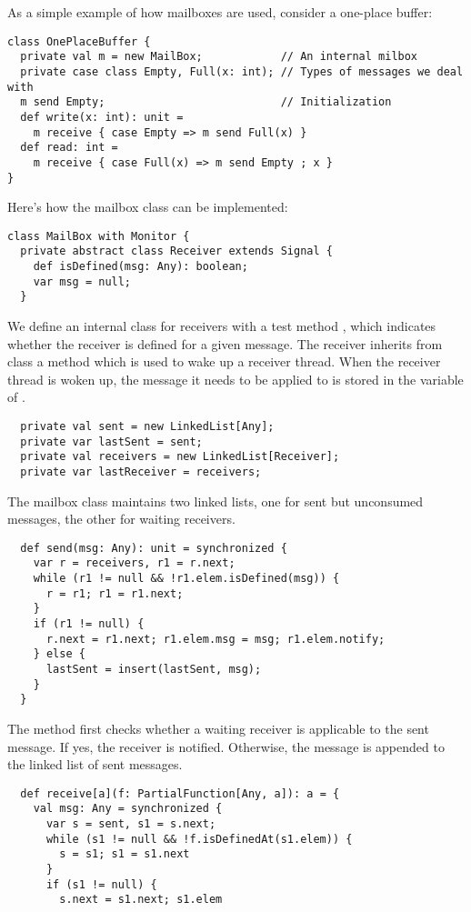 {As a simple example of how mailboxes are used, consider a
one-place buffer:
\begin{lstlisting}
class OnePlaceBuffer {
  private val m = new MailBox;            // An internal milbox
  private case class Empty, Full(x: int); // Types of messages we deal with
  m send Empty;                           // Initialization
  def write(x: int): unit =
    m receive { case Empty => m send Full(x) }
  def read: int =
    m receive { case Full(x) => m send Empty ; x }
}
\end{lstlisting}
Here's how the mailbox class can be implemented:
\begin{lstlisting}
class MailBox with Monitor {
  private abstract class Receiver extends Signal {
    def isDefined(msg: Any): boolean;
    var msg = null;
  }
\end{lstlisting}
We define an internal class for receivers with a test method
, which indicates whether the receiver is
defined for a given message.  The receiver inherits from class
 a  method which is used to wake up a
receiver thread. When the receiver thread is woken up, the message it
needs to be applied to is stored in the  variable of
.
\begin{lstlisting}
  private val sent = new LinkedList[Any];
  private var lastSent = sent;
  private val receivers = new LinkedList[Receiver];
  private var lastReceiver = receivers;
\end{lstlisting}
The mailbox class maintains two linked lists,
one for sent but unconsumed messages, the other for waiting receivers.
\begin{lstlisting}
  def send(msg: Any): unit = synchronized {
    var r = receivers, r1 = r.next;
    while (r1 != null && !r1.elem.isDefined(msg)) {
      r = r1; r1 = r1.next;
    }
    if (r1 != null) {
      r.next = r1.next; r1.elem.msg = msg; r1.elem.notify;
    } else {
      lastSent = insert(lastSent, msg);
    }
  }
\end{lstlisting}
The  method first checks whether a waiting receiver is
applicable to the sent message. If yes, the receiver is notified.
Otherwise, the message is appended to the linked list of sent messages.
\begin{lstlisting}
  def receive[a](f: PartialFunction[Any, a]): a = {
    val msg: Any = synchronized {
      var s = sent, s1 = s.next;
      while (s1 != null && !f.isDefinedAt(s1.elem)) {
        s = s1; s1 = s1.next
      }
      if (s1 != null) {
        s.next = s1.next; s1.elem

\end{lstlisting}}
